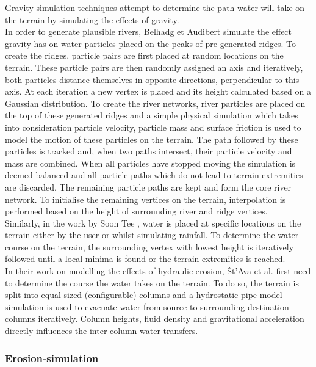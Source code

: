 Gravity simulation techniques attempt to determine the path water will take on the terrain by simulating the effects of gravity. \\

In order to generate plausible rivers, Belhadg et Audibert \cite{Belhadj2005} simulate the effect gravity has on water particles placed on the peaks of pre-generated ridges. To create the ridges, particle pairs are first placed at random locations on the terrain. These particle pairs are then randomly assigned an axis and iteratively, both particles distance themselves in opposite directions, perpendicular to this axis. At each iteration a new vertex is placed and its height calculated based on a Gaussian distribution. To create the river networks, river particles are placed on the top of these generated ridges and a simple physical simulation which takes into consideration particle velocity, particle mass and surface friction is used to model the motion of these particles on the terrain. The path followed by these particles is tracked and, when two paths intersect, their particle velocity and mass are combined. When all particles have stopped moving the simulation is deemed balanced and all particle paths which do not lead to terrain extremities are discarded. The remaining particle paths are kept and form the core river network. To initialise the remaining vertices on the terrain, interpolation is performed based on the height of surrounding river and ridge vertices.\\

Similarly, in the work by Soon Tee \cite{Teoh2008}, water is placed at specific locations on the terrain either by the user or whilst simulating rainfall. To determine the water course on the terrain, the surrounding vertex with lowest height is iteratively followed until a local minima is found or the terrain extremities is reached.\\

In their work on modelling the effects of hydraulic erosion, Št'Ava et al. \cite{StAva2008} first need to determine the course the water takes on the terrain. To do so, the terrain is split into equal-sized (configurable) columns and a hydrostatic pipe-model simulation is used to evacuate water from source to surrounding destination columns iteratively. Column heights, fluid density and gravitational acceleration directly influences the inter-column water transfers. \\

\subsubsection{Erosion-simulation}

